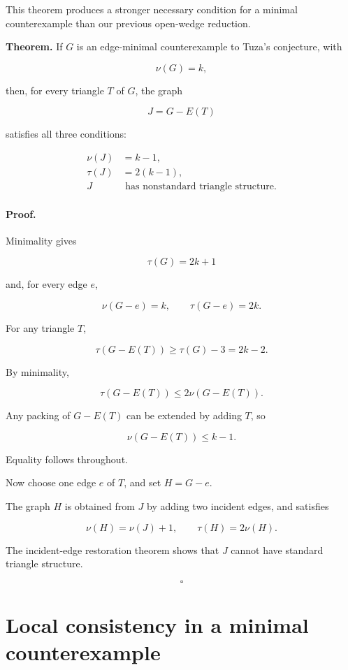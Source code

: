 \documentclass[11pt]{article}
\begin{document}
This theorem produces a stronger necessary condition for a minimal counterexample than our previous open-wedge reduction.

\textbf{Theorem.} If \(G\) is an edge-minimal counterexample to Tuza's conjecture, with

\[
\nu(G)=k,
\]

then, for every triangle \(T\) of \(G\), the graph

\[
J=G-E(T)
\]

satisfies all three conditions:

\[
\boxed{
\begin{aligned}
\nu(J)&=k-1,\\
\tau(J)&=2(k-1),\\
J&\text{ has nonstandard triangle structure.}
\end{aligned}
}
\]

\paragraph{Proof.}

Minimality gives

\[
\tau(G)=2k+1
\]

and, for every edge \(e\),

\[
\nu(G-e)=k,\qquad \tau(G-e)=2k.
\]

For any triangle \(T\),

\[
\tau(G-E(T))
\geq\tau(G)-3
=2k-2.
\]

By minimality,

\[
\tau(G-E(T))
\leq2\nu(G-E(T)).
\]

Any packing of \(G-E(T)\) can be extended by adding \(T\), so

\[
\nu(G-E(T))\leq k-1.
\]

Equality follows throughout.

Now choose one edge \(e\) of \(T\), and set \(H=G-e\).

The graph \(H\) is obtained from \(J\) by adding two incident edges, and satisfies

\[
\nu(H)=\nu(J)+1,\qquad \tau(H)=2\nu(H).
\]

The incident-edge restoration theorem shows that \(J\) cannot have standard triangle structure.

\[
\square
\]

\section{Local consistency in a minimal counterexample}
\end{document}
